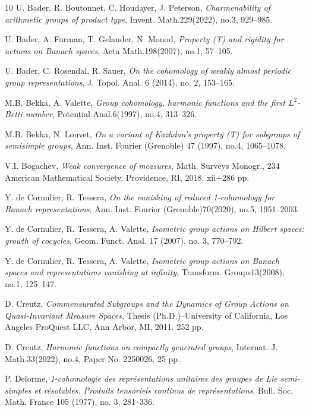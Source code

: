 \documentclass[a4paper,11pt,reqno]{amsart}
\numberwithin{equation}{section}
\theoremstyle{definition}
\theoremstyle{remark}
\theoremstyle{remark}
\begin{document}
\begin{thebibliography}{10}
 U. Bader, R. Boutonnet, C. Houdayer, J. Peterson, \emph{Charmenability of arithmetic groups of product type}, Invent. Math.229(2022), no.3, 929--985.

 U. Bader, A. Furman, T. Gelander, N. Monod, \emph{Property (T) and rigidity for actions on Banach spaces}, Acta Math.198(2007), no.1, 57--105.

 U. Bader, C. Rosendal, R. Sauer, \emph{On the cohomology of weakly almost periodic group representations}, J. Topol. Anal. 6 (2014), no. 2, 153--165.

 M.B. Bekka, A. Valette, \emph{Group cohomology, harmonic functions and the first $L^{2}$-Betti number}, Potential Anal.6(1997), no.4, 313--326.

 M.B. Bekka, N. Louvet, \emph{On a variant of Kazhdan's property (T) for subgroups of semisimple groups}, Ann. Inst. Fourier (Grenoble) 47 (1997), no.4, 1065--1078.

 V.I. Bogachev, \emph{Weak convergence of measures}, Math. Surveys Monogr., 234 American Mathematical Society, Providence, RI, 2018. xii+286 pp.

  Y. de Cornulier, R. Tessera, \emph{On the vanishing of reduced 1-cohomology for Banach representations}, Ann. Inst. Fourier (Grenoble)70(2020), no.5, 1951--2003.

 Y. de Cornulier, R. Tessera, A. Valette, \emph{Isometric group actions on Hilbert spaces: growth of cocycles}, Geom. Funct. Anal. 17 (2007), no. 3, 770--792.

 Y. de Cornulier, R. Tessera, A. Valette, \emph{Isometric group actions on Banach spaces and representations vanishing at infinity}, Transform. Groups13(2008), no.1, 125--147.

 D. Creutz, \emph{Commensurated Subgroups and the Dynamics of Group Actions on Quasi-Invariant Measure Spaces}, Thesis (Ph.D.)--University of California, Los Angeles ProQuest LLC, Ann Arbor, MI, 2011. 252 pp.

 D. Creutz, \emph{Harmonic functions on compactly generated groups}, Internat. J. Math.33(2022), no.4, Paper No. 2250026, 25 pp.

 P. Delorme, \emph{1-cohomologie des représentations unitaires des groupes de Lie semi-simples et résolubles. Produits tensoriels continus de représentations}, Bull. Soc. Math. France 105 (1977), no. 3, 281--336.


\end{thebibliography}
\end{document}
